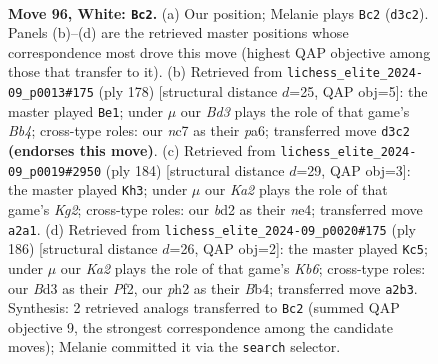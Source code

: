\documentclass[11pt]{article}
\begin{document}
\clearpage

\begin{figure}[p]\centering
\begin{subfigure}{0.46\textwidth}\centering
\resizebox{\linewidth}{!}{%
\newchessgame
\chessboard[
  setfen={5k2/1Nn5/8/8/Pp2P2n/3Bp3/K2b3p/8 w - - 0 96},
  showmover=false,
  pgfstyle=straightmove, color=movearrow, markmove={d3-c2}
]}
\caption{}
\end{subfigure}\hfill
\begin{subfigure}{0.46\textwidth}\centering
\resizebox{\linewidth}{!}{%
\newchessgame
\chessboard[
  setfen={8/8/p1k5/P6p/1B2K1bP/5p2/8/8 w - - 78 90},
  showmover=false,
  pgfstyle=straightmove, color=movearrow, markmove={b4-e1}
]}
\caption{}
\end{subfigure}
\\[4pt]
\begin{subfigure}{0.46\textwidth}\centering
\resizebox{\linewidth}{!}{%
\newchessgame
\chessboard[
  setfen={8/4k1p1/8/5p1P/2P1nP2/1n2B3/6K1/8 w - - 3 93},
  showmover=false,
  pgfstyle=straightmove, color=movearrow, markmove={g2-h3}
]}
\caption{}
\end{subfigure}\hfill
\begin{subfigure}{0.46\textwidth}\centering
\resizebox{\linewidth}{!}{%
\newchessgame
\chessboard[
  setfen={8/3k4/PK4p1/7p/1BP1b2P/5p2/5P2/8 w - - 57 94},
  showmover=false,
  pgfstyle=straightmove, color=movearrow, markmove={b6-c5}
]}
\caption{}
\end{subfigure}
\caption{\textbf{Move 96, White: \texttt{Bc2}.} (a) Our position; Melanie plays \texttt{Bc2} (\texttt{d3c2}). Panels (b)--(d) are the retrieved master positions whose correspondence most drove this move (highest QAP objective among those that transfer to it). (b) Retrieved from \texttt{lichess\_elite\_2024-09\_p0013\#175} (ply 178) [structural distance $d$=25, QAP obj=5]: the master played \texttt{Be1}; under $\mu$ our \emph{Bd3} plays the role of that game's \emph{Bb4}; cross-type roles: our \emph{n}c7 as their \emph{p}a6; transferred move \texttt{d3c2} \textbf{(endorses this move)}. (c) Retrieved from \texttt{lichess\_elite\_2024-09\_p0019\#2950} (ply 184) [structural distance $d$=29, QAP obj=3]: the master played \texttt{Kh3}; under $\mu$ our \emph{Ka2} plays the role of that game's \emph{Kg2}; cross-type roles: our \emph{b}d2 as their \emph{n}e4; transferred move \texttt{a2a1}. (d) Retrieved from \texttt{lichess\_elite\_2024-09\_p0020\#175} (ply 186) [structural distance $d$=26, QAP obj=2]: the master played \texttt{Kc5}; under $\mu$ our \emph{Ka2} plays the role of that game's \emph{Kb6}; cross-type roles: our \emph{B}d3 as their \emph{P}f2, our \emph{p}h2 as their \emph{B}b4; transferred move \texttt{a2b3}. Synthesis: 2 retrieved analogs transferred to \texttt{Bc2} (summed QAP objective 9, the strongest correspondence among the candidate moves); Melanie committed it via the \texttt{search} selector.}
\label{fig:thought-m190}
\end{figure}
\end{document}
